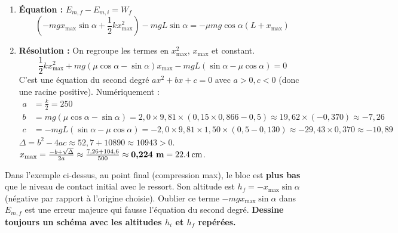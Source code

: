 \documentclass[11pt]{article}
\begin{document}
\begin{exemplebox}
\begin{enumerate}
\begin{itemize}
        \item Initial (A) : $v_i=0$, $h_i = L\sin\alpha$, $x_i=0$. $E_{m,i} = mgL\sin\alpha$.
        \item Final (B, compression max) : $v_f=0$, $h_f = -x_{\text{max}}\sin\alpha$ (le bloc descend encore de $x_{\text{max}}\sin\alpha$ en comprimant le ressort), $x_f=x_{\text{max}}$. $E_{m,f} = -mg x_{\text{max}}\sin\alpha + \frac{1}{2}k x_{\text{max}}^2$.
    \end{itemize}
    \item \textbf{Équation :} $E_{m,f} - E_{m,i} = W_f$
    \[
    \left(-mg x_{\text{max}}\sin\alpha + \frac{1}{2}k x_{\text{max}}^2\right) - mgL\sin\alpha = -\mu mg\cos\alpha (L+x_{\text{max}})
    \]
    \item \textbf{Résolution :} On regroupe les termes en $x_{\text{max}}^2$, $x_{\text{max}}$ et constant.
    \[
    \frac{1}{2}k x_{\text{max}}^2 + mg(\mu\cos\alpha - \sin\alpha)x_{\text{max}} - mgL(\sin\alpha - \mu\cos\alpha) = 0
    \]
    C'est une équation du second degré $ax^2+bx+c=0$ avec $a>0, c<0$ (donc une racine positive).
    Numériquement : 
    \begin{align*}
    a &= \frac{k}{2} = 250 \\
    b &= mg(\mu\cos\alpha - \sin\alpha) = 2,0 \times 9,81 \times (0,15 \times 0,866 - 0,5) \approx 19,62 \times (-0,370) \approx -7,26 \\
    c &= -mgL(\sin\alpha - \mu\cos\alpha) = -2,0 \times 9,81 \times 1,50 \times (0,5 - 0,130) \approx -29,43 \times 0,370 \approx -10,89
    \end{align*}
    $\Delta = b^2 - 4ac \approx 52,7 + 10890 \approx 10943 > 0$.
    $x_{\text{max}} = \frac{-b + \sqrt{\Delta}}{2a} \approx \frac{7,26 + 104,6}{500} \approx \textbf{0,224 m} = \textbf{\SI{22,4}{cm}}$.
\end{enumerate}
\end{exemplebox}

\begin{attention}
Dans l'exemple ci-dessus, au point final (compression max), le bloc est \textbf{plus bas} que le niveau de contact initial avec le ressort. Son altitude est $h_f = -x_{\text{max}}\sin\alpha$ (négative par rapport à l'origine choisie). Oublier ce terme $-mg x_{\text{max}}\sin\alpha$ dans $E_{m,f}$ est une erreur majeure qui fausse l'équation du second degré. \textbf{Dessine toujours un schéma avec les altitudes $h_i$ et $h_f$ repérées.}
\end{attention}
\end{document}
